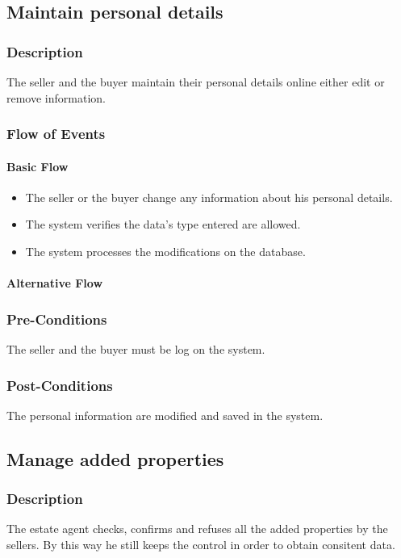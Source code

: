 \documentclass[a4paper,12pt]{article}
\begin{document}
\subsection{Maintain personal details}
\subsubsection{Description}
The seller and the buyer maintain their personal details online either edit or remove information.
\subsubsection{Flow of Events}
\paragraph{Basic Flow}
\begin{itemize}
\item The seller or the buyer change any information about his personal details.
\item The system verifies the data's type entered are allowed.
\item The system processes the modifications on the database.
\end{itemize}
\paragraph{Alternative Flow}
\begin{itemize}
\end{itemize}
\subsubsection{Pre-Conditions}
The seller and the buyer must be log on the system.
\subsubsection{Post-Conditions}
The personal information are modified and saved in the system.

\subsection{Manage added properties}
\subsubsection{Description}
The estate agent checks, confirms and refuses all the added properties by the sellers. By this way he still keeps the control in order to obtain consitent data.
\end{document}
